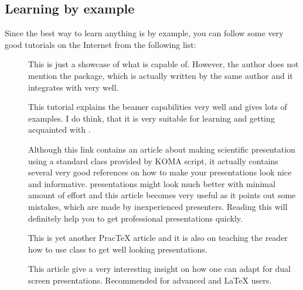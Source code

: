 \documentclass[
]{scrartcl}
\begin{document}
\subsection{Learning by example}
%
Since the best way to learn anything is by example, you can follow some very
    good tutorials on the Internet from the following list:
%
\begin{description}
    \item
        [] 
        This is just a showcase of what  is capable of.
        However, the author does not mention the  package, which is
            actually written by the same author and it integrates with
             very well.
    \item
        [] 
        This tutorial explains the beamer capabilities very well and gives lots
            of examples.
        I do think, that it is very suitable for learning and getting acquainted
            with .
    \item
        []
        Although this link contains an article about making scientific
            presentation using a standard  class provided by KOMA
            script, it actually contains several very good references on how to
            make your presentations look nice and informative.
         presentations might look much better with minimal amount of
            effort and this article becomes very useful as it points out some
            mistakes, which are made by inexperienced presenters.
        Reading this will definitely help you to get professional presentations
            quickly.
    \item
        []
        This is yet another Prac\TeX{} article and it is also on teaching the
            reader how to use  class to get well looking
            presentations.
    \item
        []
        This article give a very interesting insight on how one can adapt
             for dual screen presentations.
        Recommended for advanced  and \LaTeX{} users.
\end{description}
\end{document}
